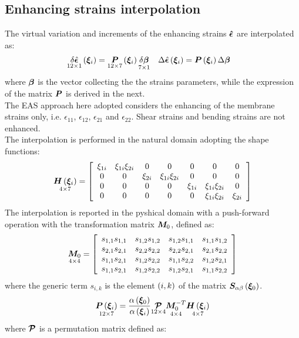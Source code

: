 \subsection{Enhancing strains interpolation}
The virtual variation and increments of the enhancing strains $\T{\hat{\epsilon}}$ are interpolated as:
\begin{align}
\underset{12 \times 1}{\delta \hat{\T{\epsilon}}} \valxii & = \underset{12 \times 7}{\T{P}} \valxii \underset{7 \times 1}{ \delta \T{\beta}} &  \Delta \hat{\T{\epsilon}}\valxii & = \T{P}\valxii \Delta \T{\beta}
\end{align}
where $\T{\beta}$ is the vector collecting the the strains parameters, while the expression of the matrix $\T{P}$ is derived in the next. \\
The EAS approach here adopted considers the enhancing of the membrane strains only, i.e. $\epsilon_{11}$, $\epsilon_{12}$, $\epsilon_{21}$ and $\epsilon_{22}$. Shear strains and bending strains are not enhanced.\\
The interpolation is performed in the natural domain adopting the shape functions:
\begin{equation}
\underset{ 4 \times 7 } { \T{ H } \valxii } =
\sqbr{ \matr{ c c c c c c c }{
\xi_{1i} & \xi_{1i} \xi_{2i} &  0    &      0      &   0   &      0      &   0     \\
  0   &      0      & \xi_{2i} & \xi_{1i} \xi_{2i} &   0   &      0      &   0     \\
  0   &      0      &  0    &      0      & \xi_{1i} & \xi_{1i} \xi_{2i} &   0      \\
  0   &      0      &  0    &      0      &   0   & \xi_{1i} \xi_{2i} & \xi_{2i}
}}
\end{equation}
The interpolation is reported in the pyshical domain with a push-forward operation with the transformation matrix $\T{M}_0$, defined as:
\begin{equation}
\underset{ 4 \times 4 } { \T{M}_0 } =
\sqbr{ \matr{ c c c c}{
s_{ 1, 1 } s_{ 1, 1 } & s_{ 1, 2 } s_{ 1, 2 } & s_{ 1, 2 } s_{ 1, 1 } &  s_{ 1, 1 } s_{ 1, 2 } \\
s_{ 2, 1 } s_{ 2, 1 } & s_{ 2, 2 } s_{ 2, 2 } & s_{ 2, 2 } s_{ 2, 1 } &  s_{ 2, 1 } s_{ 2, 2 } \\
s_{ 1, 1 } s_{ 2, 1 } & s_{ 1, 2 } s_{ 2, 2 } & s_{ 1, 1 } s_{ 2, 2 } &  s_{ 1, 2 } s_{ 2, 1 } \\
s_{ 1, 1 } s_{ 2, 1 } & s_{ 1, 2 } s_{ 2, 2 } & s_{ 1, 2 } s_{ 2, 1 } &  s_{ 1, 1 } s_{ 2, 2 }
}}
\end{equation}
where the generic term $s_{ i, k }$ is the element $\plbr{i,k}$ of the matrix $\T{ S }_{ \alpha \beta } \valxio$.\\
\begin{equation}
\underset{ 12 \times 7 }{ \T{ P } \valxii } =
\fracd{ \alpha \valxio }{ \alpha \valxii } \underset{ 12 \times 4  }{ \T{\mathcal{P}} } \underset{ 4 \times 4 }{ \T{ M }_{0}^{-T} } \underset{ 4 \times 7 }{ \T{H} \valxii }
\end{equation}
where $\T{\mathcal{P}}$ is a permutation matrix defined as:

